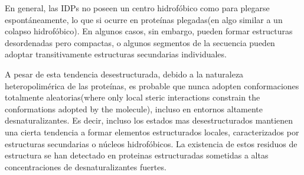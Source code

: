 % 

En general, las IDPs no poseen un centro hidrofóbico como para plegarse espontáneamente, lo que si ocurre en proteínas plegadas(en algo similar a un colapso hidrofóbico).  
En algunos casos, sin embargo, pueden formar estructuras desordenadas pero compactas, o algunos segmentos de la secuencia pueden adoptar transitivamente estructuras secundarias individuales.

A pesar de esta tendencia desestructurada, debido a la naturaleza heteropolimérica de las proteínas, es probable que nunca adopten 
conformaciones totalmente aleatorias(where only local steric interactions constrain the conformations adopted by the molecule), incluso en entornos altamente desnaturalizantes.
Es decir, incluso los estados mas desestructurados mantienen una cierta tendencia a formar elementos estructurados locales, caracterizados por estructuras secundarias o núcleos hidrofóbicos.
La existencia de estos residuos de estructura se han detectado en proteinas estructuradas sometidas a altas concentraciones de desnaturalizantes fuertes. 

